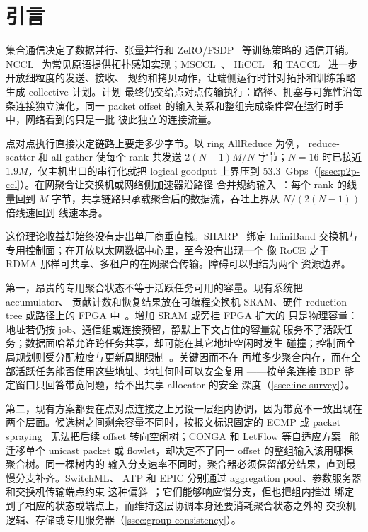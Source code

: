 \chapter{引言}
\label{chap:intro}

集合通信决定了数据并行、张量并行和 ZeRO/FSDP~\cite{zero,fsdp} 等训练策略的
通信开销。NCCL~\cite{nccl} 为常见原语提供拓扑感知实现；MSCCL~\cite{msccl}、
HiCCL~\cite{hiccl} 和 TACCL~\cite{taccl} 进一步开放细粒度的发送、接收、
规约和拷贝动作，让端侧运行时针对拓扑和训练策略生成 collective 计划。计划
最终仍交给点对点传输执行：路径、拥塞与可靠性沿每条连接独立演化，同一
packet offset 的输入关系和整组完成条件留在运行时手中，网络看到的只是一批
彼此独立的连接流量。

点对点执行直接决定链路上要走多少字节。以 ring AllReduce 为例，
reduce-scatter 和 all-gather 使每个 rank 共发送 $2(N-1)M/N$ 字节；$N=16$
时已接近 $1.9M$，仅主机出口的串行化就把 logical goodput 上界压到
53.3~Gbps（\cref{ssec:p2p-ccl}）。在网聚合让交换机或网络侧加速器沿路径
合并规约输入~\cite{switchml,netreduce,atp}：每个 rank 的线量回到 $M$
字节，共享链路只承载聚合后的数据流，吞吐上界从 $N/(2(N-1))$ 倍线速回到
线速本身。

这份理论收益却始终没有走出单厂商垂直栈。SHARP~\cite{sharp} 绑定
InfiniBand 交换机与专用控制面；在开放以太网数据中心里，至今没有出现一个
像 RoCE 之于 RDMA 那样可共享、多租户的在网聚合传输。障碍可以归结为两个
资源边界。

第一，昂贵的专用聚合状态不等于活跃任务可用的容量。现有系统把 accumulator、
贡献计数和恢复结果放在可编程交换机 SRAM、硬件 reduction tree 或路径上的
FPGA 中~\cite{switchml,atp,sharp,netreduce}。增加 SRAM 或旁挂 FPGA 扩大的
只是物理容量：地址若仍按 job、通信组或连接预留，静默上下文占住的容量就
服务不了活跃任务；数据面哈希允许跨任务共享，却可能在其它地址空闲时发生
碰撞；控制面全局规划则受分配粒度与更新周期限制~\cite{airp}。关键因而不在
再堆多少聚合内存，而在全部活跃任务能否使用这些地址、地址何时可以安全复用
——按单条连接 BDP 整定窗口只回答带宽问题，给不出共享 allocator 的安全
深度（\cref{ssec:inc-survey}）。

第二，现有方案都要在点对点连接之上另设一层组内协调，因为带宽不一致出现在
两个层面。候选树之间剩余容量不同时，按报文标识固定的 ECMP 或 packet
spraying~\cite{ecmp,themis} 无法把后续 offset 转向空闲树；CONGA 和
LetFlow 等自适应方案~\cite{conga,letflow} 能迁移单个 unicast packet 或
flowlet，却决定不了同一 offset 的整组输入该用哪棵聚合树。同一棵树内的
输入分支速率不同时，聚合器必须保留部分结果，直到最慢分支补齐。SwitchML、
ATP 和 EPIC 分别通过 aggregation pool、参数服务器和交换机传输端点约束
这种偏斜~\cite{switchml,atp,epic}；它们能够响应慢分支，但也把组内推进
绑定到了相应的状态或端点上，而维持这层协调本身还要消耗聚合状态之外的
交换机逻辑、存储或专用服务器（\cref{ssec:group-consistency}）。

